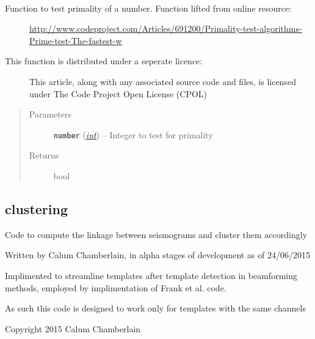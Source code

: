 \documentclass[a4paper,10pt,english]{sphinxmanual}
\begin{document}
\begin{fulllineitems}
\label{utils:findpeaks.is_prime}~\begin{description}
\item[{Function to test primality of a number. Function lifted from online resource:}] \leavevmode
\href{http://www.codeproject.com/Articles/691200/Primality-test-algorithms-Prime-test-The-fastest-w}{http://www.codeproject.com/Articles/691200/Primality-test-algorithms-Prime-test-The-fastest-w}

\item[{This function is distributed under a seperate licence:}] \leavevmode
This article, along with any associated source code and files, is
licensed under The Code Project Open License (CPOL)

\end{description}
\begin{quote}\begin{description}
\item[{Parameters}] \leavevmode
\textbf{\texttt{number}} (\href{https://docs.python.org/library/functions.html\#int}{\emph{int}}) -- Integer to test for primality

\item[{Returns}] \leavevmode
bool

\end{description}\end{quote}

\end{fulllineitems}



\subsection{clustering}
\label{utils:clustering}\label{utils:module-clustering}
Code to compute the linkage between seismograms and cluster them accordingly

Written by Calum Chamberlain, in alpha stages of development as of 24/06/2015

Implimented to streamline templates after template detection in beamforming
methods, employed by implimentation of Frank et al. code.

As such this code is designed to work only for templates with the same channels

Copyright 2015 Calum Chamberlain
\end{document}
